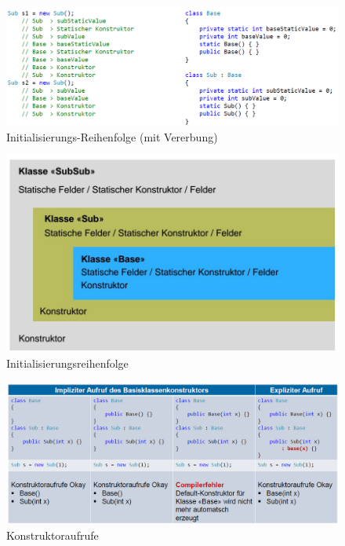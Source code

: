 \documentclass[
a4paper,
oneside,
10pt,
fleqn,
headsepline,
toc=listofnumbered, 
bibliography=totocnumbered]{scrartcl}
\begin{document}
\begin{figure}[h]
\centering
\includegraphics[width=0.9\linewidth]{images/init_order}
\caption{Initialisierungs-Reihenfolge (mit Vererbung)}
\label{fig:initorder}
\end{figure}

\begin{figure}[h]
\centering
\includegraphics[width=0.9\linewidth]{images/initialisierungsreihenfolge}
\caption{Initialisierungsreihenfolge}
\label{fig:initialisierungsreihenfolge}
\end{figure}

\begin{figure}[h]
\centering
\includegraphics[width=\linewidth]{images/init_constructors}
\caption{Konstruktoraufrufe}
\label{fig:initconstructors}
\end{figure}
\end{document}
